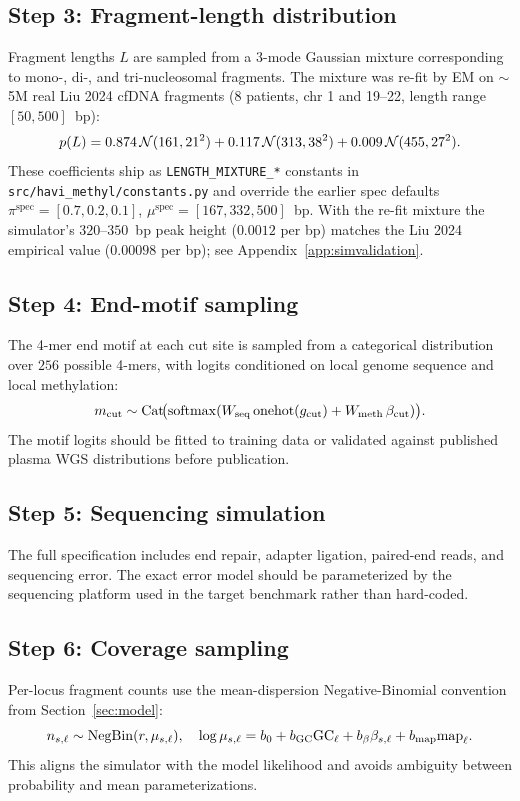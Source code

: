 \subsection*{Step 3: Fragment-length distribution}
Fragment lengths $L$ are sampled from a 3-mode Gaussian mixture corresponding to mono-, di-, and tri-nucleosomal fragments. The mixture was re-fit by EM on $\sim$5M real Liu 2024 cfDNA fragments (8 patients, chr 1 and 19--22, length range $[50, 500]$~bp):
\begin{equation}
p(L) = 0.874\,\mathcal{N}(161, 21^2) + 0.117\,\mathcal{N}(313, 38^2) + 0.009\,\mathcal{N}(455, 27^2).
\end{equation}
These coefficients ship as \texttt{LENGTH\_MIXTURE\_*} constants in \texttt{src/havi\_methyl/constants.py} and override the earlier spec defaults $\pi^{\mathrm{spec}} = [0.7, 0.2, 0.1]$, $\mu^{\mathrm{spec}} = [167, 332, 500]$~bp. With the re-fit mixture the simulator's $320$--$350$~bp peak height ($0.0012$ per bp) matches the Liu 2024 empirical value ($0.00098$ per bp); see Appendix~\ref{app:simvalidation}.

\subsection*{Step 4: End-motif sampling}
The 4-mer end motif at each cut site is sampled from a categorical distribution over $256$ possible 4-mers, with logits conditioned on local genome sequence and local methylation:
\begin{equation}
m_{\mathrm{cut}} \sim \mathrm{Cat}\!\big(\mathrm{softmax}(W_{\mathrm{seq}}\,\mathrm{onehot}(g_{\mathrm{cut}}) + W_{\mathrm{meth}}\,\beta_{\mathrm{cut}})\big).
\end{equation}
The motif logits should be fitted to training data or validated against published plasma WGS distributions before publication.

\subsection*{Step 5: Sequencing simulation}
The full specification includes end repair, adapter ligation, paired-end reads, and sequencing error. The exact error model should be parameterized by the sequencing platform used in the target benchmark rather than hard-coded.

\subsection*{Step 6: Coverage sampling}
Per-locus fragment counts use the mean-dispersion Negative-Binomial convention from Section~\ref{sec:model}:
\begin{equation}
n_{s,\ell}\sim\mathrm{NegBin}(r,\mu_{s,\ell}),\quad \log\mu_{s,\ell}=b_0+b_{\mathrm{GC}}\mathrm{GC}_\ell+b_\beta\beta_{s,\ell}+b_{\mathrm{map}}\mathrm{map}_\ell.
\end{equation}
This aligns the simulator with the model likelihood and avoids ambiguity between probability and mean parameterizations.

